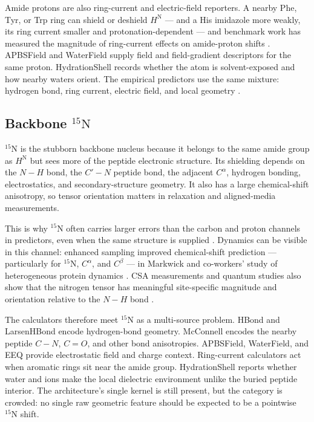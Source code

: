 \documentclass[11pt]{article}
\begin{document}
Amide protons are also ring-current and electric-field reporters. A nearby Phe,
Tyr, or Trp ring can shield or deshield \(H^\mathrm N\) --- and a His imidazole
more weakly, its ring current smaller and protonation-dependent --- and
benchmark work has measured the magnitude of ring-current effects on
amide-proton shifts \cite{christensen2011}. APBSField and WaterField supply field and
field-gradient descriptors for the same proton. HydrationShell records whether
the atom is solvent-exposed and how nearby waters orient. The empirical
predictors use the same mixture: hydrogen bond, ring current, electric field,
and local geometry \cite{neal2003,shenbax2007,han2011}.

\subsection{\texorpdfstring{Backbone \(^{15}\mathrm N\)}
{Backbone 15N}}

\(^{15}\mathrm N\) is the stubborn backbone nucleus because it belongs to the
same amide group as \(H^\mathrm N\) but sees more of the peptide electronic
structure. Its shielding depends on the \(N-H\) bond, the \(C'-N\) peptide
bond, the adjacent \(C^\alpha\), hydrogen bonding, electrostatics, and
secondary-structure geometry. It also has a large chemical-shift anisotropy,
so tensor orientation matters in relaxation and aligned-media measurements.

This is why \(^{15}\mathrm N\) often carries larger errors than the carbon and
proton channels in predictors, even when the same structure is supplied
\cite{shenbax2007,shenbax2010,han2011,larsen2015}. Dynamics can be visible in
this channel: enhanced sampling improved chemical-shift prediction ---
particularly for \(^{15}\mathrm N\), \(C^\alpha\), and \(C^\beta\) --- in
Markwick and co-workers' study of heterogeneous protein dynamics
\cite{markwick2010}. CSA measurements and quantum studies also
show that the nitrogen tensor has meaningful site-specific magnitude and
orientation relative to the \(N-H\) bond \cite{yao2010,brender2001,loth2005}.

The calculators therefore meet \(^{15}\mathrm N\) as a multi-source problem.
HBond and LarsenHBond encode hydrogen-bond geometry. McConnell encodes the
nearby peptide \(C-N\), \(C=O\), and other bond anisotropies. APBSField,
WaterField, and EEQ provide electrostatic field and charge context. Ring-current
calculators act when aromatic rings sit near the amide group. HydrationShell
reports whether water and ions make the local dielectric environment unlike the
buried peptide interior. The architecture's single kernel is still present, but
the category is crowded: no single raw geometric feature should be expected to
be a pointwise \(^{15}\mathrm N\) shift.
\end{document}
